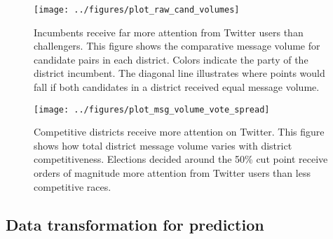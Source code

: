 \documentclass{article}
\begin{document}

\begin{figure}[ht]
  \centering
  \texttt{[image: ../figures/plot\_raw\_cand\_volumes]}
  \caption{Incumbents receive far more attention from Twitter users
    than challengers. This figure shows the comparative message volume for
    candidate pairs in each district. Colors indicate the party of the
    district incumbent. The diagonal line illustrates where points would fall if both candidates in a district received equal message volume.}
  \label{fig:cand-msg-volume}
\end{figure}

\begin{figure}[ht]
  \centering
  \texttt{[image: ../figures/plot\_msg\_volume\_vote\_spread]}
  \caption{Competitive districts receive more attention on
    Twitter. This figure shows how total district message volume
    varies with district competitiveness. Elections decided around the
  50\% cut point receive orders of magnitude more attention from
  Twitter users than less competitive races.}
  \label{fig:msg-volume-vote-spread}
\end{figure}



\subsection{Data transformation for prediction}
\label{sec:data-transf-pred}
\end{document}
